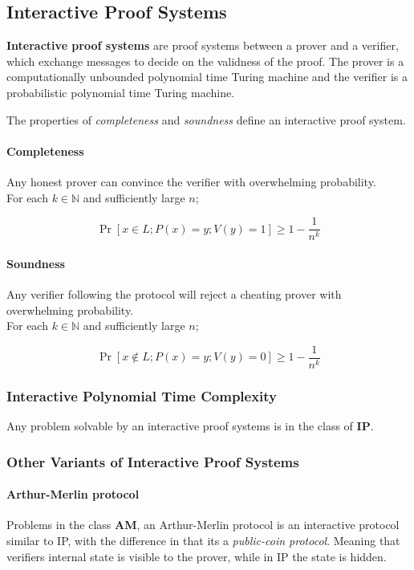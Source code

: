 \subsection{Interactive Proof Systems}
\textbf{Interactive proof systems} are proof systems between a prover and a verifier, which exchange messages to decide on the validness of the proof.
The prover is a computationally unbounded polynomial time Turing machine and the verifier is a probabilistic polynomial time Turing machine.


The properties of \textit{completeness} and \textit{soundness} define an interactive proof system.

\paragraph{Completeness}

Any honest prover can convince the verifier with overwhelming probability.\\
For each $k \in \mathbb{N}$ and sufficiently large $n$;

$$\Pr[x \in L; P(x) = y; V(y) = 1] \ge 1 - \frac{1}{n^k}$$

\paragraph{Soundness}

Any verifier following the protocol will reject a cheating prover with overwhelming probability.\\
For each $k \in \mathbb{N}$ and sufficiently large $n$;

$$\Pr[x \notin L; P(x) = y; V(y) = 0] \ge 1 - \frac{1}{n^k}$$


\subsubsection{Interactive Polynomial Time Complexity}
Any problem solvable by an interactive proof systems is in the class of \textbf{IP}.

\subsubsection{Other Variants of Interactive Proof Systems}

\paragraph{Arthur-Merlin protocol} Problems in the class \textbf{AM}, an Arthur-Merlin protocol \cite{babai1985trading} is an interactive protocol similar to IP, with the difference in that its a \textit{public-coin protocol}. 
Meaning that verifiers internal state is visible to the prover, while in IP the state is hidden.

